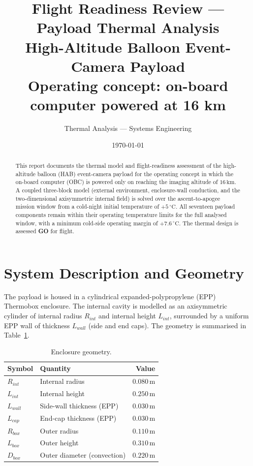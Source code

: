 \documentclass[11pt,a4paper]{article}
\title{\textbf{Flight Readiness Review --- Payload Thermal Analysis}\\[2mm]
\large High-Altitude Balloon Event-Camera Payload\\[1mm]
\normalsize Operating concept: on-board computer powered at 16 km}
\author{Thermal Analysis --- Systems Engineering}
\date{\today}
\newcommand{\degC}{\,^{\circ}\mathrm{C}}
\newcommand{\unit}[1]{\,\mathrm{#1}}
\begin{document}
\maketitle

\begin{abstract}
\noindent This report documents the thermal model and flight-readiness assessment of
the high-altitude balloon (HAB) event-camera payload for the operating concept in which
the on-board computer (OBC) is powered only on reaching the imaging altitude of
$16\unit{km}$. A coupled three-block model (external environment, enclosure-wall
conduction, and the two-dimensional axisymmetric internal field) is solved over the
ascent-to-apogee mission window from a cold-night initial temperature of $+5\degC$. All
seventeen payload components remain within their operating temperature limits for the
full analysed window, with a minimum cold-side operating margin of $+7.6\degC$. The
thermal design is assessed \textbf{GO} for flight.
\end{abstract}

\tableofcontents
\bigskip

\section{System Description and Geometry}
The payload is housed in a cylindrical expanded-polypropylene (EPP) Thermobox enclosure.
The internal cavity is modelled as an axisymmetric cylinder of internal radius $R_{int}$
and internal height $L_{int}$, surrounded by a uniform EPP wall of thickness $L_{wall}$
(side and end caps). The geometry is summarised in Table~\ref{tab:geom}.

\begin{table}[H]
\centering
\caption{Enclosure geometry.}
\label{tab:geom}
\begin{tabular}{llr}
\toprule
Symbol & Quantity & Value \\
\midrule
$R_{int}$ & Internal radius            & $0.080\unit{m}$ \\
$L_{int}$ & Internal height            & $0.250\unit{m}$ \\
$L_{wall}$& Side-wall thickness (EPP)  & $0.030\unit{m}$ \\
$L_{cap}$ & End-cap thickness (EPP)    & $0.030\unit{m}$ \\
$R_{box}$ & Outer radius               & $0.110\unit{m}$ \\
$L_{box}$ & Outer height               & $0.310\unit{m}$ \\
$D_{box}$ & Outer diameter (convection)& $0.220\unit{m}$ \\
\bottomrule
\end{tabular}
\end{table}
\end{document}
